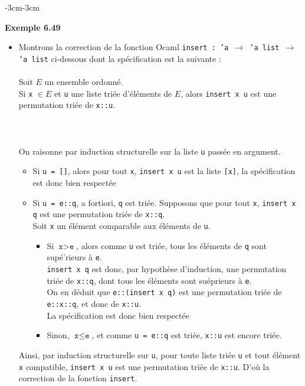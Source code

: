 \documentclass{article}
\newenvironment{exemple}[2]
{
    \begin{boite_exemple}
    \textbf{\textcolor{bleu_fonce}{Exemple #1}} \textit{#2} \\
    \begin{itemize}[label=$\blacktriangleright \quad $]                    
}
{   
    \end{itemize}
    \end{boite_exemple}
    \vspace{15pt}
}
\begin{document}
\begin{adjustwidth}{-3cm}{-3cm}
\begin{exemple}{6.49}{}
    \item Montrons la correction de la fonction Ocaml \texttt{insert : 'a $\rightarrow$ 'a list $\rightarrow$ 'a list} ci-dessous dont la spécification est la suivante : \\ \\ Soit $E$ un ensemble ordonné. \\ Si \texttt{x} $\in E$ et \texttt{u} une liste triée d'éléments de $E$, alors \texttt{insert x u} est une permutation triée de \texttt{x::u}. \\ \\ \\ \\On raisonne par induction structurelle sur la liste \texttt{u} passée en argument. \\ \begin{itemize}
        \item Si \texttt{u = []}, alors pour tout \texttt{x}, \texttt{insert x u} est la liste \texttt{[x]}, la spécification est donc bien respectée
        \item Si \texttt{u = e::q}, a fortiori, \texttt{q} est triée. Supposons que pour tout \texttt{x}, \texttt{insert x q} est une permutation triée de \texttt{x::q}. \\ Soit \texttt{x} un élément comparable aux éléments de \texttt{u}. \begin{itemize}
            \item Si $\texttt{x} > \texttt{e}$, alors comme \texttt{u} est triée, tous les éléments de \texttt{q} sont supé'rieurs à \texttt{e}. \\ \texttt{insert x q} est donc, par hypothèse d'induction, une permutation triée de \texttt{x::q}, dont tous les éléments sont suéprieurs à \texttt{e}. \\On en déduit que \texttt{e::(insert x q)} est une permutation triée de \texttt{e::x::q}, et donc de \texttt{x::u}.\\ La spécification est donc bien respectée
            \item Sinon, $\texttt{x} \leq \texttt{e}$, et comme \texttt{u = e::q} est triée, \texttt{x::u} est encore triée.
        \end{itemize}
    \end{itemize} Ainsi, par induction structurelle sur \texttt{u}, pour toute liste triée \texttt{u} et tout élément \texttt{x} compatible, \texttt{insert x u} est une permutation triée de \texttt{x::u}. D'où la correction de la fonction \texttt{insert}.
\end{exemple}

\end{adjustwidth}
\end{document}
